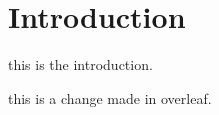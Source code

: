 \chapter{Introduction}
\label{sec:intro}

this is the introduction.

this is a change made in overleaf.